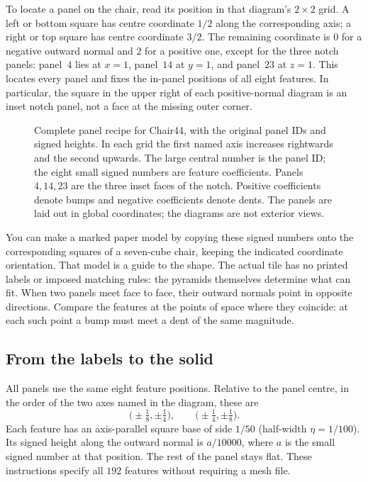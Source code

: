 To locate a panel on the chair, read its position in that diagram's $2\times2$
grid. A left or bottom square has centre coordinate $1/2$ along the corresponding
axis; a right or top square has centre coordinate $3/2$. The remaining coordinate
is $0$ for a negative outward normal and $2$ for a positive one, except for the
three notch panels: panel~$4$ lies at $x=1$, panel~$14$ at $y=1$, and panel~$23$
at $z=1$. This locates every panel and fixes the in-panel positions of all eight features.
In particular, the square in the upper right of each positive-normal diagram is
an inset notch panel, not a face at the missing outer corner.

\begin{figure}[htbp]
  \centering
  \resizebox{\linewidth}{!}{}
  \caption{Complete panel recipe for Chair44, with the original panel IDs and signed
  heights. In each grid the first named axis increases rightwards and the second
  upwards. The large central number is the panel ID; the eight small signed numbers
  are feature coefficients. Panels $4,14,23$ are the three inset faces of the notch.
  Positive coefficients denote bumps and negative coefficients denote dents.
  The panels are laid out in global coordinates; the diagrams are not exterior views.}
  \label{fig:carrier}
\end{figure}

You can make a marked paper model by copying these signed numbers onto the
corresponding squares of a seven-cube chair, keeping the indicated coordinate
orientation. That model is a guide to the shape. The actual tile has no printed
labels or imposed matching rules: the pyramids themselves determine what can fit.
When two panels meet face to face, their outward normals point in opposite
directions. Compare the features at the points of space where they coincide:
at each such point a bump must meet a dent of the same magnitude.

\subsection{From the labels to the solid}

All panels use the same eight feature positions. Relative to the panel centre,
in the order of the two axes named in the diagram, these are
\[
  \bigl(\pm\tfrac18,\pm\tfrac14\bigr),\qquad
  \bigl(\pm\tfrac14,\pm\tfrac18\bigr).
\]
Each feature has an axis-parallel square base of side $1/50$ (half-width
$\eta=1/100$). Its signed height along the outward normal is $a/10000$, where
$a$ is the small signed number at that position. The rest of the panel stays flat.
These instructions specify all $192$ features without requiring a mesh file.

